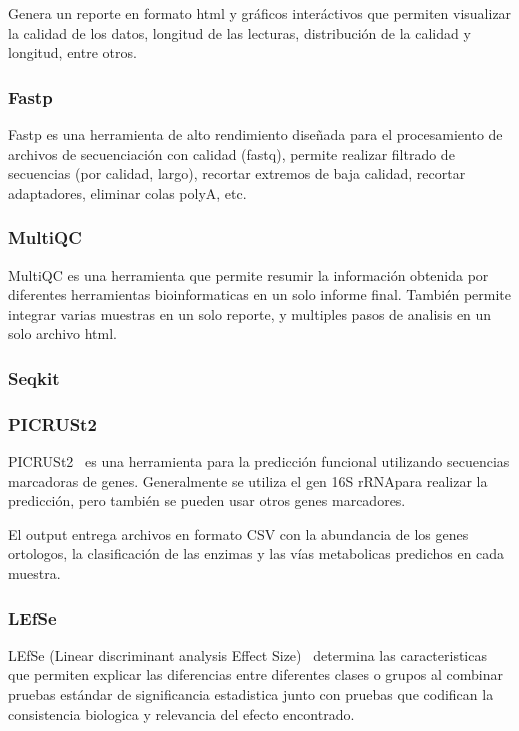 Genera un reporte en formato html y gráficos interáctivos que permiten visualizar la calidad de los datos, longitud de las lecturas, distribución de la calidad y longitud, entre otros.
\subsubsection{Fastp}

Fastp\cite{chen2018fastp} es una herramienta de alto rendimiento diseñada para el procesamiento de archivos de secuenciación con calidad (fastq), permite realizar filtrado de secuencias (por calidad, largo), recortar extremos de baja calidad, recortar adaptadores, eliminar colas polyA, etc.
\subsubsection{MultiQC}
MultiQC \cite{ewels2016multiqc} es una herramienta que permite resumir la información obtenida por diferentes herramientas bioinformaticas en un solo informe final. También permite integrar varias muestras en un solo reporte, y multiples pasos de analisis en un solo archivo html.


\subsubsection{Seqkit}

\subsubsection{PICRUSt2}
PICRUSt2~\cite{douglas2020picrust2} es una herramienta para la predicción funcional utilizando secuencias marcadoras de genes.
Generalmente se utiliza el gen 16S rRNApara realizar la predicción, pero también se pueden usar otros genes marcadores.

El output entrega archivos en formato CSV con la abundancia de los genes ortologos, la clasificación de las enzimas y las vías metabolicas predichos en cada muestra.

\subsubsection{LEfSe}
LEfSe (Linear discriminant analysis Effect Size)~\cite{segata2011metagenomic}  determina las caracteristicas que permiten explicar las diferencias entre diferentes clases o grupos al combinar pruebas estándar de significancia estadistica junto con pruebas que codifican la consistencia biologica y relevancia del efecto encontrado. 
